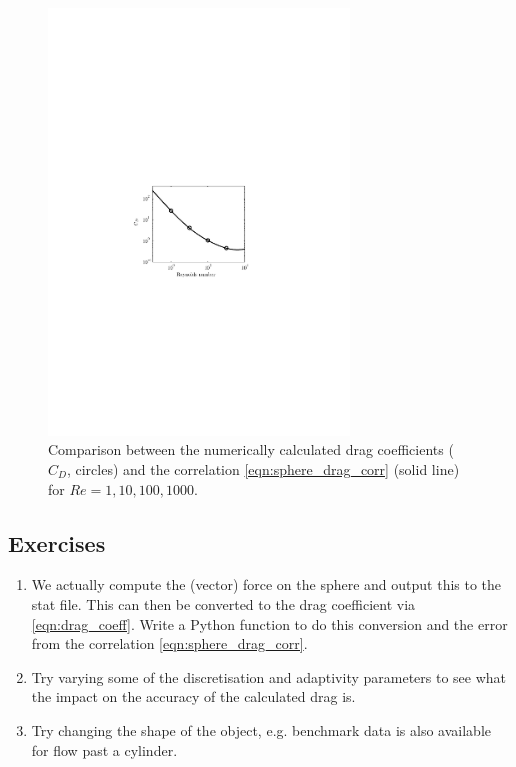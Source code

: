 \begin{figure}
\centering
\includegraphics[width=8cm,clip]{examples_images/flow_past_sphere/Sphere_Drag.pdf}
\caption{Comparison between the numerically calculated drag coefficients ($C_D$, circles) and the correlation \eqref{eqn:sphere_drag_corr} (solid line)
for $Re=1,10,100,1000$.}
\label{fig:flow_past_sphere_3}
\end{figure}



\subsection{Exercises}
\begin{enumerate}
\item We actually compute the (vector) force on the sphere and output this to the stat file. This can then be converted to the drag coefficient 
via \eqref{eqn:drag_coeff}. Write a Python function to do this conversion and the error from the correlation \eqref{eqn:sphere_drag_corr}.
\item Try varying some of the discretisation and adaptivity parameters to see what the impact on the accuracy of the
calculated drag is.
\item Try changing the shape of the object, e.g. benchmark data is also available for flow past a cylinder.
\end{enumerate}



